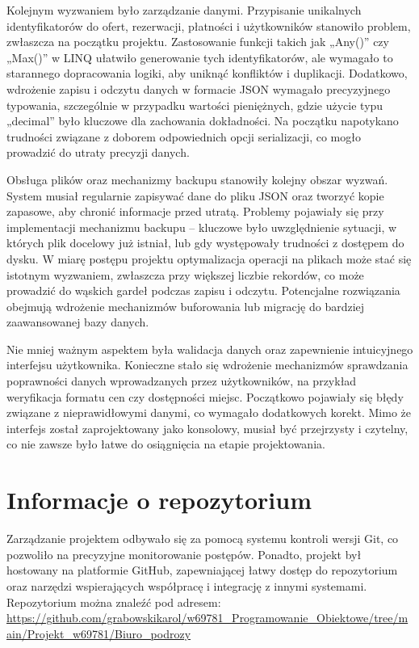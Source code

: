 Kolejnym wyzwaniem było zarządzanie danymi. Przypisanie unikalnych identyfikatorów do ofert, rezerwacji, płatności i użytkowników stanowiło problem, zwłaszcza na początku projektu. Zastosowanie funkcji takich jak „Any()” czy „Max()” w LINQ ułatwiło generowanie tych identyfikatorów, ale wymagało to starannego dopracowania logiki, aby uniknąć konfliktów i duplikacji. Dodatkowo, wdrożenie zapisu i odczytu danych w formacie JSON wymagało precyzyjnego typowania, szczególnie w przypadku wartości pieniężnych, gdzie użycie typu „decimal” było kluczowe dla zachowania dokładności. Na początku napotykano trudności związane z doborem odpowiednich opcji serializacji, co mogło prowadzić do utraty precyzji danych.

Obsługa plików oraz mechanizmy backupu stanowiły kolejny obszar wyzwań. System musiał regularnie zapisywać dane do pliku JSON oraz tworzyć kopie zapasowe, aby chronić informacje przed utratą. Problemy pojawiały się przy implementacji mechanizmu backupu – kluczowe było uwzględnienie sytuacji, w których plik docelowy już istniał, lub gdy występowały trudności z dostępem do dysku. W miarę postępu projektu optymalizacja operacji na plikach może stać się istotnym wyzwaniem, zwłaszcza przy większej liczbie rekordów, co może prowadzić do wąskich gardeł podczas zapisu i odczytu. Potencjalne rozwiązania obejmują wdrożenie mechanizmów buforowania lub migrację do bardziej zaawansowanej bazy danych.

Nie mniej ważnym aspektem była walidacja danych oraz zapewnienie intuicyjnego interfejsu użytkownika. Konieczne stało się wdrożenie mechanizmów sprawdzania poprawności danych wprowadzanych przez użytkowników, na przykład weryfikacja formatu cen czy dostępności miejsc. Początkowo pojawiały się błędy związane z nieprawidłowymi danymi, co wymagało dodatkowych korekt. Mimo że interfejs został zaprojektowany jako konsolowy, musiał być przejrzysty i czytelny, co nie zawsze było łatwe do osiągnięcia na etapie projektowania.

\section{Informacje o repozytorium}

Zarządzanie projektem odbywało się za pomocą systemu kontroli wersji Git, co pozwoliło na precyzyjne monitorowanie postępów. Ponadto, projekt był hostowany na platformie GitHub, zapewniającej łatwy dostęp do repozytorium oraz narzędzi wspierających współpracę i integrację z innymi systemami. Repozytorium można znaleźć pod adresem:\\

\url{https://github.com/grabowskikarol/w69781_Programowanie_Obiektowe/tree/main/Projekt_w69781/Biuro_podrozy}


